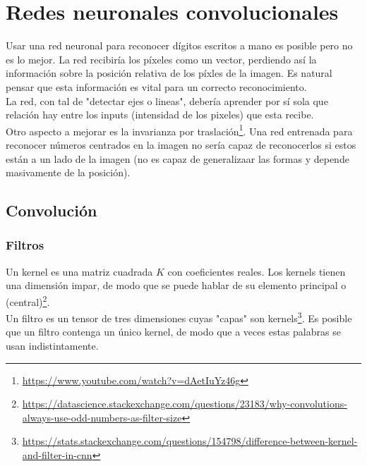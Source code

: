 \documentclass{article}
\begin{document}
\section{Redes neuronales convolucionales}

Usar una red neuronal para reconocer dígitos escritos a mano es posible pero no es lo mejor. La red recibiría los píxeles como un vector, perdiendo así la información sobre la posición relativa de los píxles de la imagen. Es natural pensar que esta información es vital para un correcto reconocimiento.\\

La red, con tal de "detectar ejes o lineas", debería aprender por sí sola que relación hay entre los inputs (intensidad de los pixeles) que esta recibe.\\

Otro aspecto a mejorar es la invarianza por traslación\footnote{\url{https://www.youtube.com/watch?v=dAetIuYz46g}}. Una red entrenada para reconocer números centrados en la imagen no sería capaz de reconocerlos si estos están a un lado de la imagen (no es capaz de generalizaar las formas y depende masivamente de la posición).

\subsection{Convolución}

\subsubsection{Filtros}
Un kernel es una matriz cuadrada $K$ con coeficientes reales. Los kernels tienen una dimensión impar, de modo que se puede hablar de su elemento principal o (central)\footnote{\url{https://datascience.stackexchange.com/questions/23183/why-convolutions-always-use-odd-numbers-as-filter-size}}.\\

Un filtro es un tensor de tres dimensiones cuyas "capas" son kernels\footnote{\url{https://stats.stackexchange.com/questions/154798/difference-between-kernel-and-filter-in-cnn}}. Es posible que un filtro contenga un único kernel, de modo que a veces  estas palabras se usan indistintamente.\\
\end{document}
